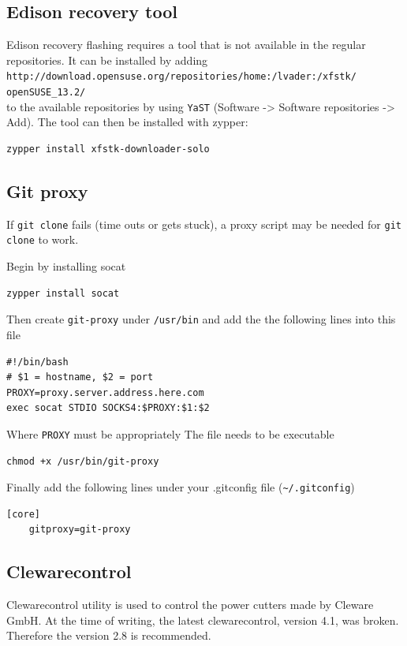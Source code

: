 \documentclass[a4paper,11pt]{article}
\newcommand{\cmd}[1]{\texttt{#1}}
\begin{document}
\subsection*{Edison recovery tool}

Edison recovery flashing requires a tool that is not available in the regular repositories. It can be installed by adding \\
\cmd{http://download.opensuse.org/repositories/home:/lvader:/xfstk/
openSUSE\_13.2/} \\
to the available repositories by using \cmd{YaST} (Software -> Software repositories -> Add). The tool can then be installed with zypper:
\begin{lstlisting}
zypper install xfstk-downloader-solo
\end{lstlisting}

\subsection*{Git proxy}
\label{gitclone}
If \cmd{git clone} fails (time outs or gets stuck), a proxy script may be needed for \cmd{git clone} to work.

Begin by installing socat

\begin{lstlisting}
zypper install socat
\end{lstlisting}

Then create \cmd{git-proxy} under \cmd{/usr/bin} and add the the following lines into this file

\begin{lstlisting}
#!/bin/bash
# $1 = hostname, $2 = port
PROXY=proxy.server.address.here.com
exec socat STDIO SOCKS4:$PROXY:$1:$2
\end{lstlisting}

Where \cmd{PROXY} must be appropriately
The file needs to be executable

\begin{lstlisting}
chmod +x /usr/bin/git-proxy
\end{lstlisting}

Finally add the following lines under your .gitconfig file (\cmd{\textasciitilde/.gitconfig})

\begin{lstlisting}
[core]
	gitproxy=git-proxy
\end{lstlisting}

\subsection*{Clewarecontrol}
Clewarecontrol utility is used to control the power cutters made by Cleware GmbH. At the time of writing, the latest clewarecontrol, version 4.1, was broken. Therefore the version 2.8 is recommended.
\end{document}

